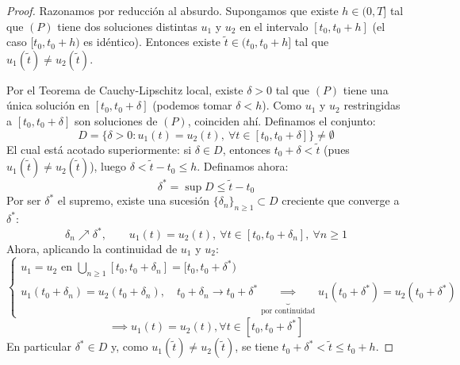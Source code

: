 \begin{proof}
    Razonamos por reducción al absurdo. Supongamos que existe $h \in (0, T]$ tal que $(P)$ tiene dos soluciones distintas $u_1$ y $u_2$ en el intervalo $[t_0, t_0 + h]$ (el caso $[t_0, t_0 + h)$ es idéntico). Entonces existe $\widetilde{t} \in (t_0, t_0 + h]$ tal que $u_1(\widetilde{t}) \neq u_2(\widetilde{t})$.

    Por el Teorema de Cauchy-Lipschitz local, existe $\delta > 0$ tal que $(P)$ tiene una única solución en $[t_0, t_0 + \delta]$ (podemos tomar $\delta < h$). Como $u_1$ y $u_2$ restringidas a $[t_0, t_0 + \delta]$ son soluciones de $(P)$, coinciden ahí. Definamos el conjunto:
    \[
        D = \{ \delta > 0 : u_1(t) = u_2(t), \ \forall t \in [t_0, t_0 + \delta] \} \neq \emptyset
    \]
    El cual está acotado superiormente: si $\delta \in D$, entonces $t_0 + \delta < \widetilde{t}$ (pues $u_1(\widetilde{t}) \neq u_2(\widetilde{t})$), luego $\delta < \widetilde{t} - t_0 \leq h$. Definamos ahora:
    \[
        \delta^* = \sup D \leq \widetilde{t} - t_0
    \]
    Por ser $\delta^*$ el supremo, existe una sucesión $\{ \delta_n \}_{n \geq 1} \subset D$ creciente que converge a $\delta^*$:
    \[
        \delta_n \nearrow \delta^*, \qquad
        u_1(t) = u_2(t), \ \forall t \in [t_0, t_0 + \delta_n], \ \forall n \geq 1
    \]
    Ahora, aplicando la continuidad de $u_1$ y $u_2$:
    \[
        \begin{cases}
            u_1 = u_2 \text{ en } \bigcup_{n \geq 1} [t_0, t_0 + \delta_n] = [t_0, t_0 + \delta^*) \\
            u_1(t_0 + \delta_n) = u_2(t_0 + \delta_n), \quad t_0 + \delta_n \to t_0 + \delta^* \underbrace{\implies}_{\text{por continuidad}} u_1(t_0 + \delta^*) = u_2(t_0 + \delta^*)
        \end{cases}
    \]
    \[
        \implies
        \boxed{u_1(t) = u_2(t), \forall t \in [t_0, t_0 + \delta^*]}
    \]
    En particular $\delta^* \in D$ y, como $u_1(\widetilde{t}) \neq u_2(\widetilde{t})$, se tiene $t_0 + \delta^* < \widetilde{t} \leq t_0 + h$.


\end{proof}
